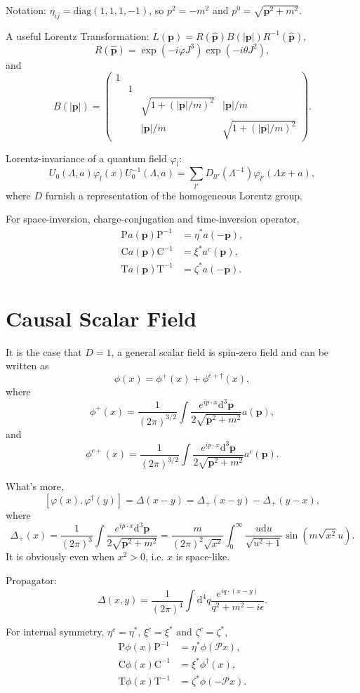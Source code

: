 \documentclass[9pt]{extbook}
\begin{document}
Notation: $\eta_{ij}=\mathrm{diag}(1,1,1,-1)$, so $p^2=-m^2$ and $p^0=\sqrt{\bm{p}^2+m^2}$.

A useful Lorentz Transformation: $L(\bm{p})=R(\hat{\bm{p}})B(|\bm{p}|)R^{-1}(\hat{\bm{p}})$, 
\[
	R(\hat{\bm{p}})=\exp(-i\varphi J^3)\exp(-i\theta J^2),
\]
and 
\[
	B(|\bm{p}|)=
	\begin{pmatrix}
		1&&&\\
		&1&&\\
		&&\sqrt{1+(|\bm{p}|/m)^2}&|\bm{p}|/m\\
		&&|\bm{p}|/m&\sqrt{1+(|\bm{p}|/m)^2}
	 \end{pmatrix}.
\]

Lorentz-invariance of a quantum field $\varphi_l$:
\[
	U_0(\Lambda,a)\varphi_l(x)U_0^{-1}(\Lambda,a)=\sum_{l'}D_{ll'}(\Lambda^{-1})\varphi_{l'}(\Lambda x+a),
\]
where $D$ furnish a representation of the homogeneous Lorentz group.

For space-inversion, charge-conjugation and time-inversion operator,
\begin{align*}
	\mathrm{P}a(\bm{p})\mathrm{P}^{-1}&=\eta^*a(-\bm{p}),\\
	\mathrm{C}a(\bm{p})\mathrm{C}^{-1}&=\xi^*a^c(\bm{p}),\\
	\mathrm{T}a(\bm{p})\mathrm{T}^{-1}&=\zeta^*a(-\bm{p}).
\end{align*}

\section{Causal Scalar Field}
It is the case that $D=1$, a general scalar field is spin-zero field and can be written as
\[
	\phi(x)=\phi^+(x)+\phi^{c+\dag}(x),
\]
where
\[
	\phi^+(x)=\frac{1}{(2\pi)^{3/2}}\int \frac{e^{ip\cdot x}\mathrm{d}^3\bm{p}}{2\sqrt{\bm{p}^2+m^2}}a(\bm{p}),
\]
and
\[
	\phi^{c+}(x)=\frac{1}{(2\pi)^{3/2}}\int \frac{e^{ip\cdot x}\mathrm{d}^3\bm{p}}{2\sqrt{\bm{p}^2+m^2}}a^c(\bm{p}).
\]

What's more,
\[
	[\varphi(x),\varphi^\dag(y)]=\Delta(x-y)=\Delta_+(x-y)-\Delta_+(y-x),
\]
where
\[
	\Delta_+(x)=\frac{1}{(2\pi)^3}\int  \frac{e^{ip\cdot x}\mathrm{d}^3\bm{p}}{2\sqrt{\bm{p}^2+m^2}}=\frac{m}{(2\pi)^2\sqrt{x^2}}\int_0^\infty  \frac{u\mathrm{d} u}{\sqrt{u^2+1}}\sin(m\sqrt{x^2}u).
\]
It is obviously even when $x^2>0$, i.e. $x$ is space-like.

Propagator:
\[
	\Delta(x,y)=\frac{1}{(2\pi)^4}\int \mathrm{d}^4q \frac{e^{iq\cdot (x-y)}}{q^2+m^2-i\epsilon}.
\]

For internal symmetry, $\eta^c=\eta^*$, $\xi^c=\xi^*$ and $\zeta^c=\zeta^*$,
\[
\begin{split}
	\mathrm{P}\phi(x)\mathrm{P}^{-1}&=\eta^*\phi(\mathscr{P}x),\\
	\mathrm{C}\phi(x)\mathrm{C}^{-1}&=\xi^*\phi^{\dag}(x),\\
	\mathrm{T}\phi(x)\mathrm{T}^{-1}&=\zeta^*\phi(-\mathscr{P}x).
\end{split}
\]
\end{document}
